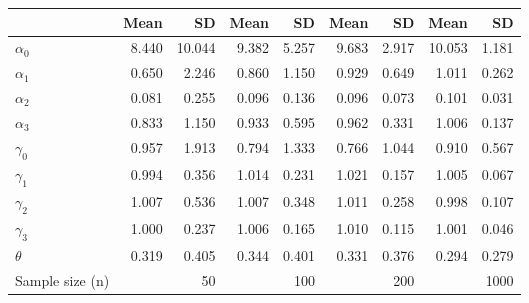 
\begin{tabular}[t]{lrrrrrrrr}
\toprule
  & Mean & SD & Mean  & SD  & Mean   & SD   & Mean    & SD   \\
\midrule
$\alpha_{0}$ & 8.440 & 10.044 & 9.382 & 5.257 & 9.683 & 2.917 & 10.053 & 1.181\\
$\alpha_{1}$ & 0.650 & 2.246 & 0.860 & 1.150 & 0.929 & 0.649 & 1.011 & 0.262\\
$\alpha_{2}$ & 0.081 & 0.255 & 0.096 & 0.136 & 0.096 & 0.073 & 0.101 & 0.031\\
$\alpha_{3}$ & 0.833 & 1.150 & 0.933 & 0.595 & 0.962 & 0.331 & 1.006 & 0.137\\
$\gamma_{0}$ & 0.957 & 1.913 & 0.794 & 1.333 & 0.766 & 1.044 & 0.910 & 0.567\\
$\gamma_{1}$ & 0.994 & 0.356 & 1.014 & 0.231 & 1.021 & 0.157 & 1.005 & 0.067\\
$\gamma_{2}$ & 1.007 & 0.536 & 1.007 & 0.348 & 1.011 & 0.258 & 0.998 & 0.107\\
$\gamma_{3}$ & 1.000 & 0.237 & 1.006 & 0.165 & 1.010 & 0.115 & 1.001 & 0.046\\
$\theta$ & 0.319 & 0.405 & 0.344 & 0.401 & 0.331 & 0.376 & 0.294 & 0.279\\
Sample size (n) &  & 50 &  & 100 &  & 200 &  & 1000\\
\bottomrule
\end{tabular}
